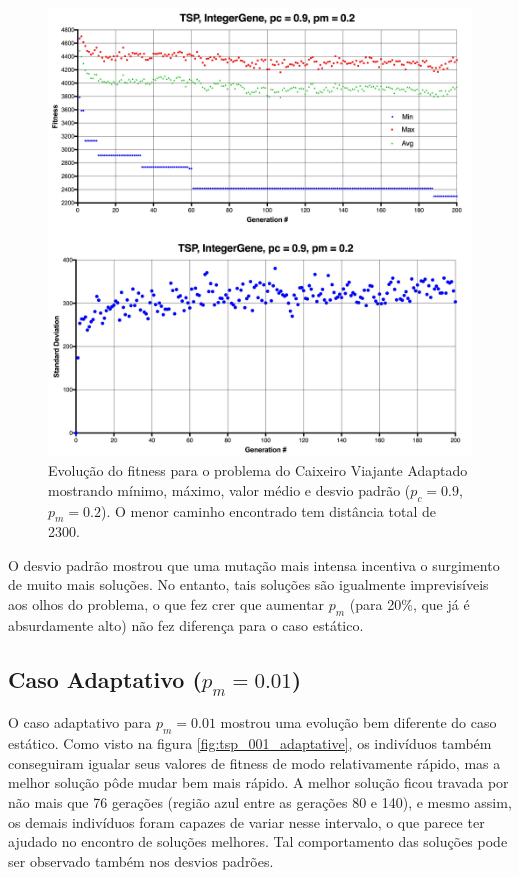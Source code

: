 \begin{figure}[ht!]
    \centering \includegraphics[width=1.0\textwidth]{tsp_02.jpg}
    \caption{Evolução do fitness para o problema do Caixeiro Viajante Adaptado mostrando mínimo, máximo, valor médio e desvio padrão ($p_c=0.9$, $p_m=0.2$). O menor caminho encontrado tem distância total de 2300.}
    \label{fig:tsp02}
\end{figure}

O desvio padrão mostrou que uma mutação mais intensa incentiva o surgimento de muito mais soluções. No entanto, tais soluções são igualmente imprevisíveis aos olhos do problema, o que fez crer que aumentar $p_m$ (para 20\%, que já é absurdamente alto) não fez diferença para o caso estático.

\subsection{Caso Adaptativo ($p_m = 0.01$)}

O caso adaptativo para $p_m = 0.01$ mostrou uma evolução bem diferente do caso estático. Como visto na figura \ref{fig:tsp_001_adaptative}, os indivíduos também conseguiram igualar seus valores de fitness de modo relativamente rápido, mas a melhor solução pôde mudar bem mais rápido. A melhor solução ficou travada por não mais que 76 gerações (região azul entre as gerações 80 e 140), e mesmo assim, os demais indivíduos foram capazes de variar nesse intervalo, o que parece ter ajudado no encontro de soluções melhores. Tal comportamento das soluções pode ser observado também nos desvios padrões.

